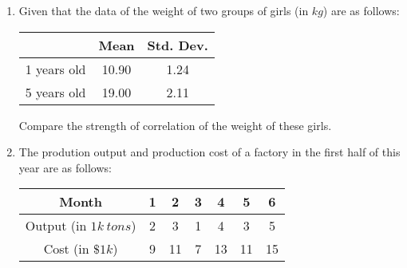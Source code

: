 \documentclass{report}
\begin{document}
\begin{multicols}{2}
\begin{enumerate}
    \item Given that the data of the weight of two groups of girls (in $kg$) are as
          follows:
          \begin{center}
            \begin{tabular}{|c|c|c|}
              \hline
                          & Mean  & Std. Dev. \\
              \hline
              1 years old & 10.90 & 1.24      \\
              5 years old & 19.00 & 2.11      \\
              \hline
            \end{tabular}
          \end{center}
          Compare the strength of correlation of the weight of these girls.

    \item The prodution output and production cost of a factory in the first half of this
          year are as follows:
          \begin{center}
            \begin{tabular}{|c|c|c|c|c|c|c|}
              \hline
              Month                  & 1 & 2  & 3 & 4  & 5  & 6  \\
              \hline
              Output (in $1k\ tons$) & 2 & 3  & 1 & 4  & 3  & 5  \\
              Cost (in $\$1k$)       & 9 & 11 & 7 & 13 & 11 & 15 \\
              \hline
            \end{tabular}
          \end{center}


\end{enumerate}
\end{multicols}
\end{document}

